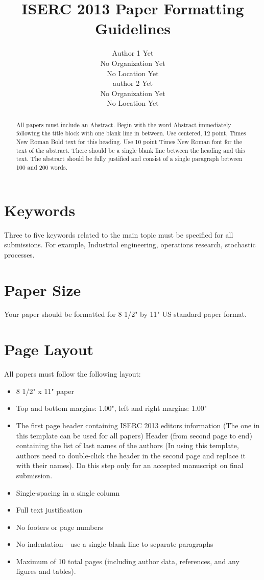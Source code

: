 \documentclass{iserc}%
\title{ISERC 2013 Paper Formatting Guidelines}
\author{
Author 1 Yet\\No Organization Yet\\No Location Yet \\
\vspace{0.3cm}%
author 2 Yet\\No Organization Yet\\No Location Yet}
\begin{document}
\maketitle

\begin{abstract}
All papers must include an Abstract.  Begin with the word Abstract immediately following the title block with one blank line in between.  Use centered, 12 point, Times New Roman Bold text for this heading.  Use 10 point Times New Roman font for the text of the abstract.  There should be a single blank line between the heading and this text.  The abstract should be fully justified and consist of a single paragraph between 100 and 200 words.
\end{abstract}

\section*{Keywords}
Three to five keywords related to the main topic must be specified for all submissions.  For example, Industrial engineering, operations research, stochastic processes.

\section{Paper Size}
Your paper should be formatted for 8 1/2" by 11" US standard paper format.

\section{Page Layout}
All papers must follow the following layout: 
\begin{itemize}
\item 8 1/2" x 11" paper 
\item Top and bottom margins: 1.00", left and right margins: 1.00" 
\item The first page header containing ISERC 2013 editors information (The one in this template can be used for all papers)
Header (from second page to end) containing the list of last names of the authors (In using this template, authors need to double-click the header in the second page and replace it with their names).  Do this step only for an accepted manuscript on final submission.
\item Single-spacing in a single column
\item Full text justification
\item No footers or page numbers 
\item No indentation - use a single blank line to separate paragraphs 
\item Maximum of 10 total pages (including author data, references, and any figures and tables).
\end{itemize} 
 
\end{document}
